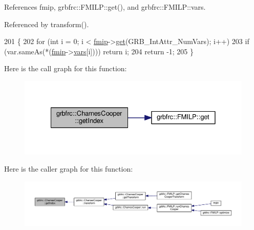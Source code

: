 References fmip, grbfrc\+::\+F\+M\+I\+L\+P\+::get(), and grbfrc\+::\+F\+M\+I\+L\+P\+::vars.



Referenced by transform().


\begin{DoxyCode}
201  \{
202   \textcolor{keywordflow}{for} (\textcolor{keywordtype}{int} i = 0; i < \hyperlink{classgrbfrc_1_1CharnesCooper_a107817ee13698551fae6263c8849f730}{fmip}->\hyperlink{classgrbfrc_1_1FMILP_a5f74659534b60535f4cacce86ac94c23}{get}(GRB\_IntAttr\_NumVars); i++)
203     \textcolor{keywordflow}{if} (var.sameAs(*(\hyperlink{classgrbfrc_1_1CharnesCooper_a107817ee13698551fae6263c8849f730}{fmip}->\hyperlink{classgrbfrc_1_1FMILP_acbf6866651d8b8b18c094302cf2a4284}{vars}[i]))) \textcolor{keywordflow}{return} i;
204   \textcolor{keywordflow}{return} -1;
205  \}
\end{DoxyCode}


Here is the call graph for this function\+:
\nopagebreak
\begin{figure}[H]
\begin{center}
\leavevmode
\includegraphics[width=328pt]{classgrbfrc_1_1CharnesCooper_a48c5969100c05b92d2f60e8f48925b0d_cgraph}
\end{center}
\end{figure}




Here is the caller graph for this function\+:
\nopagebreak
\begin{figure}[H]
\begin{center}
\leavevmode
\includegraphics[width=350pt]{classgrbfrc_1_1CharnesCooper_a48c5969100c05b92d2f60e8f48925b0d_icgraph}
\end{center}
\end{figure}


